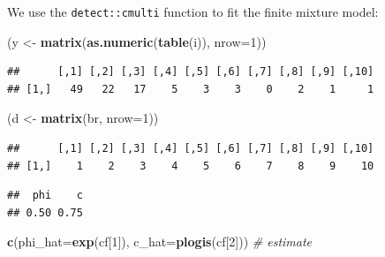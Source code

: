 \documentclass[12pt,]{book}
\newenvironment{Shaded}{\begin{snugshade}}{\end{snugshade}}
\newcommand{\CommentTok}[1]{\textcolor[rgb]{0.56,0.35,0.01}{\textit{#1}}}
\newcommand{\DataTypeTok}[1]{\textcolor[rgb]{0.13,0.29,0.53}{#1}}
\newcommand{\DecValTok}[1]{\textcolor[rgb]{0.00,0.00,0.81}{#1}}
\newcommand{\KeywordTok}[1]{\textcolor[rgb]{0.13,0.29,0.53}{\textbf{#1}}}
\newcommand{\NormalTok}[1]{#1}
\newcommand{\OperatorTok}[1]{\textcolor[rgb]{0.81,0.36,0.00}{\textbf{#1}}}
\newcommand{\StringTok}[1]{\textcolor[rgb]{0.31,0.60,0.02}{#1}}
\begin{document}
We use the \texttt{detect::cmulti} function to fit the finite mixture model:

\begin{Shaded}
\begin{Highlighting}[]
\NormalTok{(y <-}\StringTok{ }\KeywordTok{matrix}\NormalTok{(}\KeywordTok{as.numeric}\NormalTok{(}\KeywordTok{table}\NormalTok{(i)), }\DataTypeTok{nrow=}\DecValTok{1}\NormalTok{))}
\end{Highlighting}
\end{Shaded}

\begin{verbatim}
##      [,1] [,2] [,3] [,4] [,5] [,6] [,7] [,8] [,9] [,10]
## [1,]   49   22   17    5    3    3    0    2    1     1
\end{verbatim}

\begin{Shaded}
\begin{Highlighting}[]
\NormalTok{(d <-}\StringTok{ }\KeywordTok{matrix}\NormalTok{(br, }\DataTypeTok{nrow=}\DecValTok{1}\NormalTok{))}
\end{Highlighting}
\end{Shaded}

\begin{verbatim}
##      [,1] [,2] [,3] [,4] [,5] [,6] [,7] [,8] [,9] [,10]
## [1,]    1    2    3    4    5    6    7    8    9    10
\end{verbatim}

\begin{Shaded}
\end{Shaded}

\begin{verbatim}
##  phi    c 
## 0.50 0.75
\end{verbatim}

\begin{Shaded}
\begin{Highlighting}[]
\KeywordTok{c}\NormalTok{(}\DataTypeTok{phi_hat=}\KeywordTok{exp}\NormalTok{(cf[}\DecValTok{1}\NormalTok{]), }\DataTypeTok{c_hat=}\KeywordTok{plogis}\NormalTok{(cf[}\DecValTok{2}\NormalTok{])) }\CommentTok{# estimate}
\end{Highlighting}
\end{Shaded}
\end{document}
